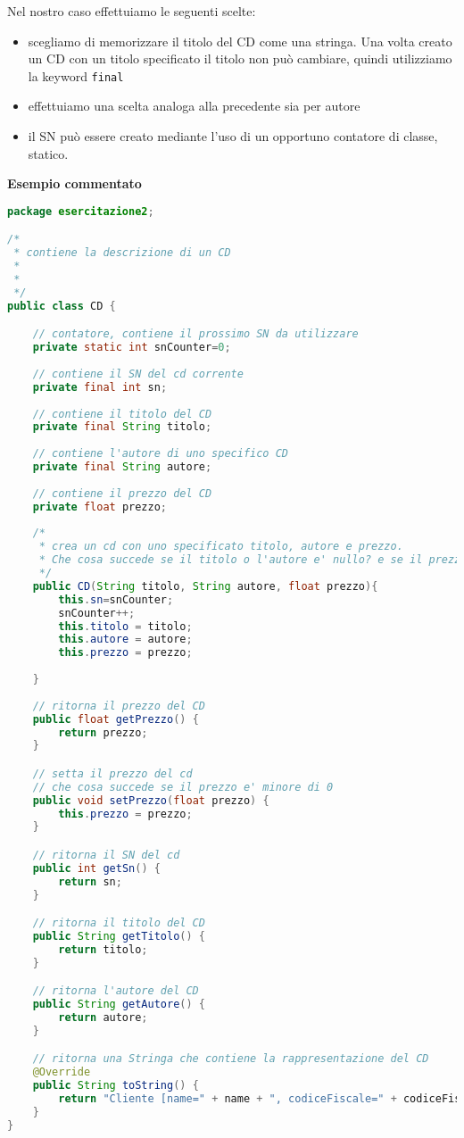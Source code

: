 \documentclass{article}
\begin{document}
Nel nostro caso effettuiamo le seguenti scelte:
\begin{itemize}
\item scegliamo di memorizzare il titolo del CD come una stringa. Una volta creato un CD con un titolo specificato il titolo non pu\`o cambiare, quindi utilizziamo la keyword \texttt{final}
\item effettuiamo una scelta analoga alla precedente sia per autore
\item il SN pu\`o essere creato mediante l'uso di un opportuno contatore di classe, statico. 
\end{itemize}

\textbf{Esempio commentato}
\begin{lstlisting}[language=Java,escapechar=|]
package esercitazione2;

/*
 * contiene la descrizione di un CD
 * 
 *
 */
public class CD {

	// contatore, contiene il prossimo SN da utilizzare
	private static int snCounter=0;
	
	// contiene il SN del cd corrente
	private final int sn;
	
	// contiene il titolo del CD
	private final String titolo;
	
	// contiene l'autore di uno specifico CD
	private final String autore;
	
	// contiene il prezzo del CD
	private float prezzo;
	
	/*
	 * crea un cd con uno specificato titolo, autore e prezzo.
	 * Che cosa succede se il titolo o l'autore e' nullo? e se il prezzo e' minore di 0?
	 */
	public CD(String titolo, String autore, float prezzo){
		this.sn=snCounter;
		snCounter++;
		this.titolo = titolo;
		this.autore = autore;
		this.prezzo = prezzo;
		
	}
	
	// ritorna il prezzo del CD
	public float getPrezzo() {
		return prezzo;
	}

	// setta il prezzo del cd
	// che cosa succede se il prezzo e' minore di 0
	public void setPrezzo(float prezzo) {
		this.prezzo = prezzo;
	}

	// ritorna il SN del cd
	public int getSn() {
		return sn;
	}

	// ritorna il titolo del CD
	public String getTitolo() {
		return titolo;
	}

	// ritorna l'autore del CD
	public String getAutore() {
		return autore;
	}

	// ritorna una Stringa che contiene la rappresentazione del CD 
	@Override
	public String toString() {
		return "Cliente [name=" + name + ", codiceFiscale=" + codiceFiscale+ "]";
	}
}
\end{lstlisting}
\end{document}
